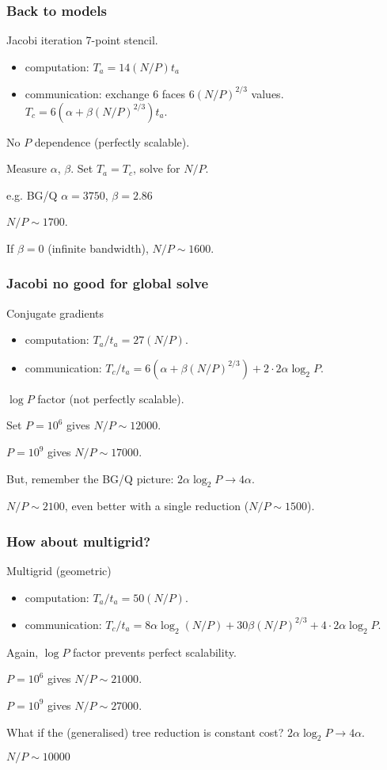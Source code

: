 \documentclass[presentation]{beamer}
\begin{document}
\begin{frame}
  \frametitle{Back to models}

  \begin{block}{Jacobi iteration}
    7-point stencil.

    \begin{itemize}
    \item computation: $T_a = 14 (N/P) t_a$
    \item communication: exchange 6 faces $6 (N/P)^{2/3}$ values.
      $T_c = 6(\alpha + \beta (N/P)^{2/3})t_a$.
    \end{itemize}
    No $P$ dependence (perfectly scalable).

    Measure $\alpha$, $\beta$.  Set $T_a = T_c$, solve for $N/P$.

    e.g. BG/Q $\alpha = 3750$, $\beta = 2.86$

    $N/P \sim 1700$.

    If $\beta = 0$ (infinite bandwidth), $N/P \sim 1600$.
  \end{block}
\end{frame}
\begin{frame}
  \frametitle{Jacobi no good for global solve}
  \begin{block}{Conjugate gradients}
    \begin{itemize}
    \item computation: $T_a/t_a = 27 (N/P)$.
    \item communication: $T_c/t_a = 6(\alpha + \beta(N/P)^{2/3}) +
      2\cdot 2\alpha\log_2 P$.
    \end{itemize}

    $\log P$ factor (not perfectly scalable).

    Set $P=10^6$ gives $N/P \sim 12000$.

    $P=10^9$ gives $N/P \sim 17000$.

    But, remember the BG/Q picture: $2 \alpha \log_2 P \rightarrow 4
    \alpha$.

    $N/P \sim 2100$, even better with a single reduction ($N/P \sim 1500$).
  \end{block}
\end{frame}
\begin{frame}
  \frametitle{How about multigrid?}
  \begin{block}{Multigrid (geometric)}
    \begin{itemize}
    \item computation: $T_a/t_a = 50 (N/P)$.
    \item communication: $T_c / t_a = 8 \alpha \log_2(N/P) + 30
      \beta(N/P)^{2/3} + 4\cdot 2 \alpha \log_2 P$.
    \end{itemize}
    Again, $\log P$ factor prevents perfect scalability.

    $P=10^6$ gives $N/P \sim 21000$.

    $P = 10^9$ gives $N/P \sim 27000$.

    What if the (generalised) tree reduction is constant cost?
    $2\alpha \log_2 P \rightarrow 4 \alpha$.

    $N/P \sim 10000$
  \end{block}
\end{frame}
\end{document}
